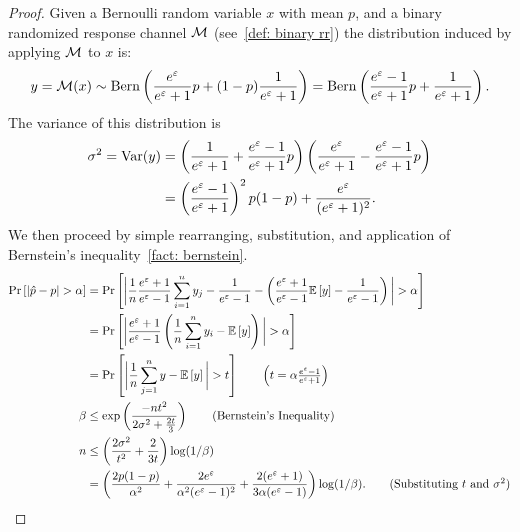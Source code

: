 \begin{proof}
    Given a Bernoulli random variable $x$ with mean $p$, and a binary randomized response channel $\mathcal{M}$ (see~\autoref{def: binary rr}) the distribution induced by applying $\mathcal{M}$ to $x$ is:
    \begin{equation*}
    \label{eq:rr-bern-induced}
    y=\mathcal{M}(x)\sim\operatorname{Bern}\left(\frac{e^\varepsilon}{e^\varepsilon + 1}p + (1-p)\frac{1}{e^\varepsilon + 1}\right)=\operatorname{Bern}\left(\frac{e^\varepsilon-1}{e^\varepsilon + 1}p + \frac{1}{e^\varepsilon + 1}\right).
    \end{equation*}
    The variance of this distribution is 
    \begin{align*}
\sigma^2=\operatorname{Var}(y)&=\left(\frac{1}{e^\varepsilon + 1}+\frac{e^\varepsilon-1}{e^\varepsilon + 1}p \right)\left( \frac{e^\varepsilon}{e^\varepsilon + 1}-\frac{e^\varepsilon-1}{e^\varepsilon + 1}p\right)\notag\\
&=\left(\frac{e^\varepsilon - 1}{e^\varepsilon + 1}\right)^2p(1-p) + \frac{e^\varepsilon}{(e^\varepsilon + 1)^2}.  \label{eq:rr-bern-var}
    \end{align*}
    We then proceed by simple rearranging, substitution, and application of Bernstein's inequality~\cref{fact: bernstein}.
    \begin{align*}
        \Pr\left[|\hat{p}-p| >\acc\right]&=\Pr\left[\bigg|\frac{1}{n}\frac{e^\priv + 1}{e^\priv - 1}\sum\limits_{i=1}^n y_j - \frac{1}{e^\priv - 1} - \left(\frac{e^\priv + 1}{e^\priv - 1}\bEE{y} - \frac{1}{e^\priv - 1}\right)\bigg| >\acc\right]\\
&=\Pr\left[\bigg|\frac{e^\priv + 1}{e^\priv -1}\left(\frac{1}{n}\sum\limits_{i=1}^n y_i -\bEE{y}\right)\bigg|>\acc\right]\\
&=\Pr\left[\bigg|\frac{1}{n}\sum\limits_{j=1}^ny -\bEE{y}\bigg|>t\right]\tag*{$\left(t=\acc\frac{e^\priv -1}{e^\priv +1}\right)$}\\
\failp&\leq\exp\left(\frac{-nt^2}{2\sigma^2 + \frac{2t}{3}}\right)\tag{Bernstein's Inequality}\\
n&\leq\left(\frac{2\sigma^2}{t^2} +\frac{2}{3t} \right)\log(1/\failp)\\
    &=\left( \frac{2p(1-p)}{\acc^2} +\frac{2e^\priv}{\acc^2(e^\priv - 1)^2}+\frac{2(e^\priv + 1)}{3\acc(e^\priv - 1)}\right)\log(1/\failp).\tag{Substituting $t$ and $\sigma^2$}
    \end{align*}
\end{proof}


